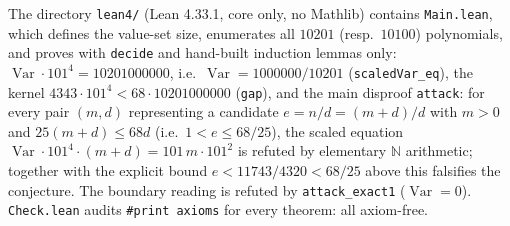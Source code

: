 \documentclass[11pt]{article}
\begin{document}
The directory \texttt{lean4/} (Lean 4.33.1, core only, no Mathlib) contains \texttt{Main.lean}, which defines the value-set size, enumerates all $10201$ (resp.\ $10100$) polynomials, and proves with \texttt{decide} and hand-built induction lemmas only: $\operatorname{Var}\cdot 101^4 = 10201000000$, i.e.\ $\operatorname{Var}=1000000/10201$ (\texttt{scaledVar\_eq}), the kernel $4343\cdot 101^4 < 68\cdot 10201000000$ (\texttt{gap}), and the main disproof \texttt{attack}: for every pair $(m,d)$ representing a candidate $e=n/d=(m+d)/d$ with $m>0$ and $25(m+d)\le 68d$ (i.e.\ $1<e\le 68/25$), the scaled equation $\operatorname{Var}\cdot 101^4\cdot(m+d) = 101\,m\cdot 101^2$ is refuted by elementary $\mathbb{N}$ arithmetic; together with the explicit bound $e<11743/4320<68/25$ above this falsifies the conjecture. The boundary reading is refuted by \texttt{attack\_exact1} ($\operatorname{Var}=0$). \texttt{Check.lean} audits \texttt{\#print axioms} for every theorem: all axiom-free.
\end{document}
